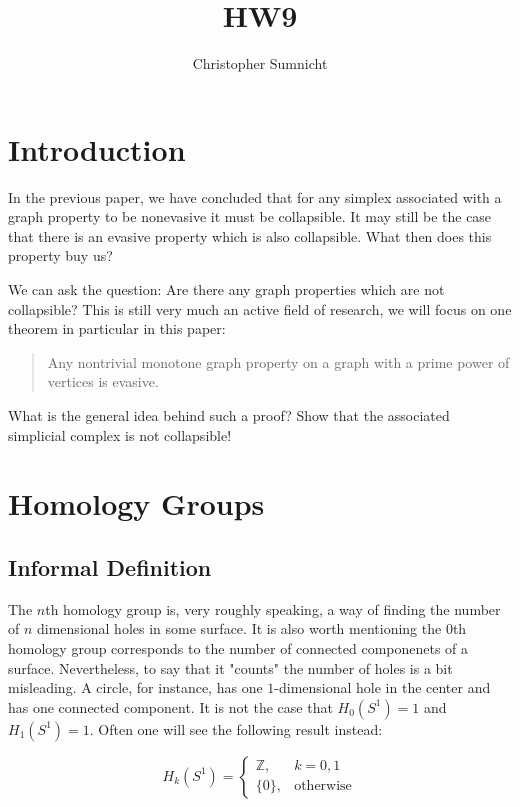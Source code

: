 \documentclass[letterpaper,12pt]{article}
\begin{document}
\title{HW9}
\author{Christopher Sumnicht}
\maketitle

\section{Introduction}

In the previous paper, we have concluded that for any simplex associated with a graph property to be nonevasive it must be collapsible. It may still be the case that there is an evasive property which is also collapsible. What then does this property buy us?

We can ask the question: Are there any graph properties which are not collapsible? This is still very much an active field of research, we will focus on one theorem in particular in this paper:

\begin{quote}
    Any nontrivial monotone graph property on a graph with a prime power of vertices is evasive.
\end{quote}

What is the general idea behind such a proof? Show that the associated simplicial complex is not collapsible!

\section{Homology Groups}

\subsection{Informal Definition}

The $n$th homology group is, very roughly speaking, a way of finding the number of $n$ dimensional holes in some surface. It is also worth mentioning the $0$th homology group corresponds to the number of connected componenets of a surface. Nevertheless, to say that it "counts" the number of holes is a bit misleading. A circle, for instance, has one $1$-dimensional hole in the center and has one connected component. It is not the case that $H_0(S^1) = 1$ and $H_1(S^1) = 1$. Often one will see the following result instead:

$$H_k(S^1) =
\begin{cases}
    \mathbb{Z}, & k = 0, 1 \\
    \{ 0 \}, & \text{otherwise}
\end{cases}
$$
\end{document}
